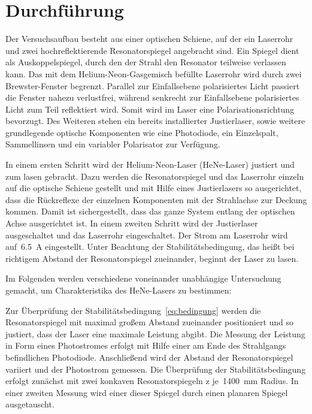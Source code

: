 \section{Durchführung}
\label{sec:durchführung}

Der Versuchsaufbau besteht aus einer optischen Schiene, auf der ein Laserrohr
und zwei hochreflektierende Resonatorspiegel angebracht sind. Ein Spiegel dient
als Auskoppelspiegel, durch den der Strahl den Resonator teilweise
verlassen kann. Das mit dem Helium-Neon-Gasgemisch befüllte Laserrohr wird
durch zwei Brewster-Fenster begrenzt. Parallel zur Einfallsebene polarisiertes
Licht passiert die Fenster nahezu verlustfrei, während senkrecht zur
Einfallsebene polarisiertes Licht zum Teil reflektiert wird. Somit wird im Laser
eine Polarisationsrichtung bevorzugt. Des Weiteren stehen ein bereits
installierter Justierlaser, sowie weitere grundlegende optische Komponenten wie
eine Photodiode, ein Einzelspalt, Sammellinsen und ein variabler Polarisator zur Verfügung.

In einem ersten Schritt wird der Helium-Neon-Laser (HeNe-Laser) justiert und zum
lasen gebracht. Dazu werden die Resonatorspiegel und das Laserrohr einzeln auf
die optische Schiene gestellt und mit Hilfe eines Justierlasers so ausgerichtet,
dass die Rückreflexe der einzelnen Komponenten mit der Strahlachse zur Deckung
kommen. Damit ist sichergestellt, dass das ganze System entlang der optischen
Achse ausgerichtet ist. In einem zweiten Schritt wird der Justierlaser
ausgeschaltet und das Laserrohr eingeschaltet. Der Strom am Laserrohr wird
auf~\SI{6.5}{\ampere} eingestellt. Unter Beachtung der Stabilitätsbedingung,
das heißt bei richtigem Abstand der Resonatorspiegel zueinander, beginnt der
Laser zu lasen.

Im Folgenden werden verschiedene voneinander unabhängige Untersuchung gemacht,
um Charakteristika des HeNe-Lasers zu bestimmen:

Zur Überprüfung der Stabilitätsbedingung~\eqref{eq:bedingung} werden die
Resonatorspiegel mit maximal großem Abstand zueinander positioniert und so
justiert, dass der Laser eine maximale Leistung abgibt. Die Messung der
Leistung in Form eines Photostromes erfolgt mit Hilfe einer am Ende des
Strahlgangs befindlichen Photodiode. Anschließend wird der Abstand der
Resonatorspiegel variiert und der Photostrom gemessen. Die Überprüfung der
Stabilitätsbedingung erfolgt zunächst mit zwei konkaven Resonatorspiegeln z
je~\SI{1400}{\milli\metre} Radius. In einer zweiten Messung wird einer dieser
Spiegel durch einen planaren Spiegel ausgetauscht.

